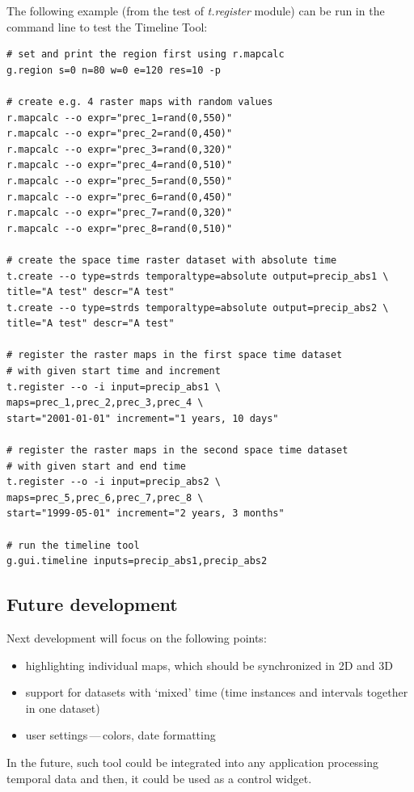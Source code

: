 \documentclass[a4paper,12pt,oneside]{book}
\newcommand{\module}[1]{\textsl{#1}}
\newcommand{\dash}{\mbox{\,---\,}}
\begin{document}
The following example (from the test of \module{t.register} module)
can be run in the command line to test the Timeline Tool:
\begin{small}
\begin{lstlisting}[style=mybash]
# set and print the region first using r.mapcalc
g.region s=0 n=80 w=0 e=120 res=10 -p

# create e.g. 4 raster maps with random values
r.mapcalc --o expr="prec_1=rand(0,550)"
r.mapcalc --o expr="prec_2=rand(0,450)"
r.mapcalc --o expr="prec_3=rand(0,320)"
r.mapcalc --o expr="prec_4=rand(0,510)"
r.mapcalc --o expr="prec_5=rand(0,550)"
r.mapcalc --o expr="prec_6=rand(0,450)"
r.mapcalc --o expr="prec_7=rand(0,320)"
r.mapcalc --o expr="prec_8=rand(0,510)"

# create the space time raster dataset with absolute time
t.create --o type=strds temporaltype=absolute output=precip_abs1 \
title="A test" descr="A test"
t.create --o type=strds temporaltype=absolute output=precip_abs2 \
title="A test" descr="A test"

# register the raster maps in the first space time dataset
# with given start time and increment
t.register --o -i input=precip_abs1 \
maps=prec_1,prec_2,prec_3,prec_4 \
start="2001-01-01" increment="1 years, 10 days"

# register the raster maps in the second space time dataset
# with given start and end time
t.register --o -i input=precip_abs2 \
maps=prec_5,prec_6,prec_7,prec_8 \
start="1999-05-01" increment="2 years, 3 months"

# run the timeline tool
g.gui.timeline inputs=precip_abs1,precip_abs2
\end{lstlisting}
\end{small}

\subsection{Future development}
Next development will focus on the following points:
\begin{itemize}
  \item highlighting individual maps, which should be synchronized in 2D and 3D
  \item support for datasets with `mixed' time (time instances and intervals together in one dataset)
  \item user settings\dash colors, date formatting
\end{itemize}
In the future, such tool could be integrated into any application processing temporal data
and then, it could be used as a control widget.
\end{document}
